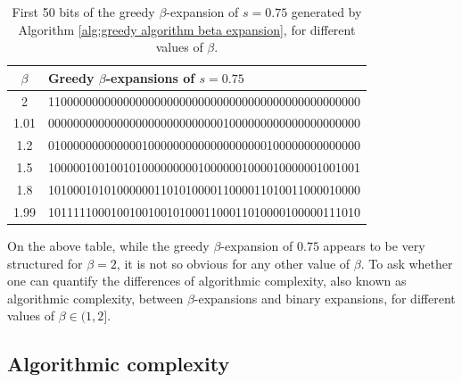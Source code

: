   \begin{table}[H]
	\centering
		\begin{tabular}{c|l}
			$\beta$ & Greedy $\beta$-expansions of $s = 0.75$\\
			\hline
			2 & 11000000000000000000000000000000000000000000000000\\
			1.01 & 00000000000000000000000000001000000000000000000000\\
			1.2 & 01000000000000010000000000000000000100000000000000\\
			1.5 & 10000010010010100000000010000001000010000001001001\\
			1.8 & 10100010101000000110101000011000011010011000010000\\
			1.99 & 10111110001001001001010001100011010000100000111010
		\end{tabular}
		\caption{First 50 bits of the greedy $\beta$-expansion of $s=0.75$ generated by Algorithm \ref{alg:greedy algorithm beta expansion}, for different values of $\beta$.}\label{tab:different beta expansions of}
	\end{table}
  
  On the above table, while the greedy $\beta$-expansion of $0.75$ appears to be very structured for $\beta=2$, it is not so obvious for any other value of $\beta$. To ask whether one can quantify the differences of algorithmic complexity, also known as algorithmic complexity, between $\beta$-expansions and binary expansions, for different values of $\beta \in (1,2]$.



\subsection{Algorithmic complexity}

\label{subsec:algorithmic complexity}

